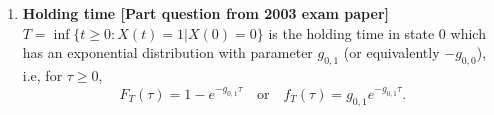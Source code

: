 \documentclass[11pt,a4paper]{article}
\begin{document}
\begin{enumerate}
    \item \textbf{Holding time [Part question from 2003 exam paper]}\\
    $T = \inf\{t \geq 0: X(t) = 1|X(0) = 0\}$ is the holding time in state 0 which has an exponential distribution with parameter $g_{0,1}$ (or equivalently $-g_{0,0}$), i.e, for $\tau \geq 0$,
    $$
    F_T(\tau) = 1 - e^{-g_{0,1}\tau} \quad\text{or}\quad f_T(\tau) = g_{0,1}e^{-g_{0,1}\tau}.
    $$
  \end{enumerate}
\end{document}
